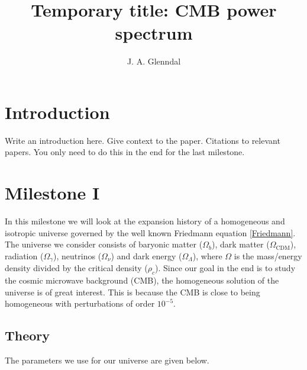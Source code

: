 \documentclass{aa}
\begin{document}
 

   \title{Temporary title: CMB power spectrum}

   \author{J. A. Glenndal}


   \date{}



   \maketitle

\section{Introduction}
Write an introduction here. Give context to the paper. Citations to relevant papers. You only need to do this in the end for the last milestone.

\section{Milestone I}
In this milestone we will look at the expansion history of a homogeneous and isotropic universe governed by the well known Friedmann equation \ref{Friedmann}.
The universe we consider consists of baryonic matter ($\Omega_b$), dark matter ($\Omega_\mathrm{CDM}$), radiation ($\Omega_\gamma$), neutrinos ($\Omega_\nu$)
and dark energy ($\Omega_\Lambda$), where $\Omega$ is the mass/energy density divided by the critical density ($\rho_c$). Since our goal in the end is to study the
cosmic microwave background (CMB), the homogeneous solution of the universe is of great interest. This is because the CMB is close to
being homogeneous with perturbations of order $10^{-5}$.
     


\subsection{Theory}
The parameters we use for our universe are given below.
\end{document}
